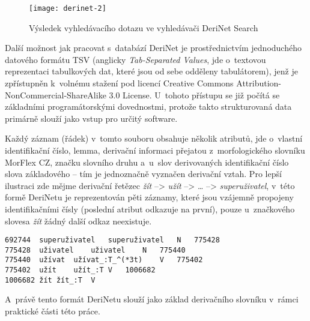 \begin{figure}[ht]   
    \centering
    \texttt{[image: derinet-2]}  
    \caption{Výsledek vyhledávacího dotazu ve vyhledávači DeriNet Search~\parencite{derinet}}
    \label{derinet-2}
 \end{figure}

Další možnost jak pracovat s~databází DeriNet je prostřednictvím
jednoduchého datového formátu TSV (anglicky \emph{Tab-Separated Values},
jde o~textovou reprezentaci tabulkových dat, které jsou od sebe odděleny
tabulátorem), jenž je zpřístupněn k~volnému stažení pod licencí Creative
Commons Attribution-NonCommercial-ShareAlike 3.0 License. U~tohoto
přístupu se již počítá se základními programátorskými dovednostmi,
protože takto strukturovaná data primárně slouží jako vstup pro určitý
software.~\parencite{derinet-cz}

Každý záznam (řádek) v~tomto souboru obsahuje několik atributů, jde
o~vlastní identifikační číslo, lemma, derivační informaci přejatou
z~morfologického slovníku MorFlex CZ, značku slovního druhu a~u~slov
derivovaných identifikační číslo slova základového -- tím je jednoznačně
vyznačen derivační vztah. Pro lepší ilustraci zde mějme derivační
řetězec \emph{žít} --\textgreater{} \emph{užít} --\textgreater{}
\ldots{} --\textgreater{} \emph{superuživatel}, v~této formě DeriNetu je
reprezentován pěti záznamy, které jsou vzájemně propojeny
identifikačními čísly (poslední atribut odkazuje na první), pouze
u~značkového slovesa \emph{žít} žádný další odkaz neexistuje.
\parencite{derinet}

\begin{verbatim}
692744  superuživatel   superuživatel   N   775428
775428  uživatel    uživatel    N   775440
775440  užívat  užívat_:T_^(*3t)    V   775402
775402  užít    užít_:T V   1006682
1006682 žít žít_:T  V
\end{verbatim}

A~právě tento formát DeriNetu slouží jako základ derivačního slovníku
v~rámci praktické části této práce.
